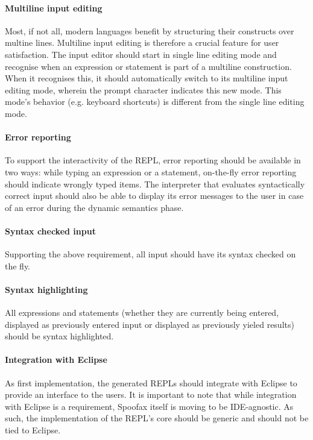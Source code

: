 \paragraph{Multiline input editing} Most, if not all, modern languages benefit
by structuring their constructs over multine lines. Multiline input editing is
therefore a crucial feature for user satisfaction. The input editor should
start in single line editing mode and recognise when an expression or statement
is part of a multiline construction. When it recognises this, it should
automatically switch to its multiline input editing mode, wherein the
prompt character indicates this new mode. This mode's behavior (e.g. keyboard
shortcuts) is different from the single line editing mode.

\paragraph{Error reporting} To support the interactivity of the REPL, error
reporting should be available in two ways: while typing an expression or a
statement, on-the-fly error reporting should indicate wrongly typed items. The
interpreter that evaluates syntactically correct input should also be able to
display its error messages to the user in case of an error during the dynamic
semantics phase.

\paragraph{Syntax checked input} Supporting the above requirement, all
input should have its syntax checked on the fly.

\paragraph{Syntax highlighting} All expressions and statements (whether they are
currently being entered, displayed as previously entered input or displayed as
previously yieled results) should be syntax highlighted.

\paragraph{Integration with Eclipse} As first implementation, the generated
REPLs should integrate with Eclipse to provide an interface to the users. It is
important to note that while integration with Eclipse is a requirement, Spoofax
itself is moving to be IDE-agnostic. As such, the implementation of the REPL's
core should be generic and should not be tied to Eclipse.

